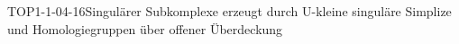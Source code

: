 
\begin{DEF}{TOP1-1-04-16}{Singulärer Subkomplexe erzeugt durch U-kleine singuläre Simplize und Homologiegruppen über offener Überdeckung}
\end{DEF}
